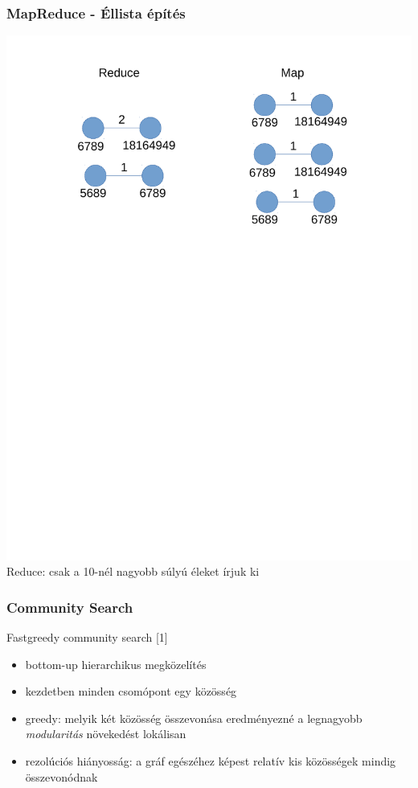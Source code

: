 \documentclass{beamer}
\begin{document}
\begin{frame}
\frametitle{MapReduce - Éllista építés}
\includegraphics[scale=0.6,trim = 2cm 17cm 3cm 0cm, clip]{figures/mapreduce.pdf} \\
Reduce: csak a 10-nél nagyobb súlyú éleket írjuk ki
\end{frame}

\begin{frame}
\frametitle{Community Search} 
Fastgreedy community search [1]
\begin{itemize}
\item bottom-up hierarchikus megközelítés
\item kezdetben minden csomópont egy közösség
\item greedy: melyik két közösség összevonása eredményezné a legnagyobb \emph{modularitás} növekedést lokálisan
\item rezolúciós hiányosság: a gráf egészéhez képest relatív kis közösségek mindig összevonódnak
\end{itemize}
\end{frame}
\end{document}
